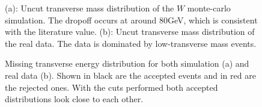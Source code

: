 \documentclass[twoside,        %
               BCOR12mm,       %
               ngerman,english, %
               fleqn,headsepline=false,footsepline=false
              ]{Vorlage/MFPREPORT}
\begin{document}
\begin{figure}
    \caption{(a): Uncut transverse mass distribution of the $W$ monte-carlo
    simulation. The dropoff occurs at around 80\;GeV, which is consistent with
    the literature value. (b): Uncut transverse mass distribution of the real
    data. The data is dominated by low-transverse mass events.}
\end{figure}

\begin{figure}
    \caption{Missing transverse energy distribution for both simulation (a) and
    real data (b). Shown in black are the accepted events and in red are the rejected
    ones. With the cuts performed both accepted distributions look close to
    each other.}
\end{figure}
\end{document}
